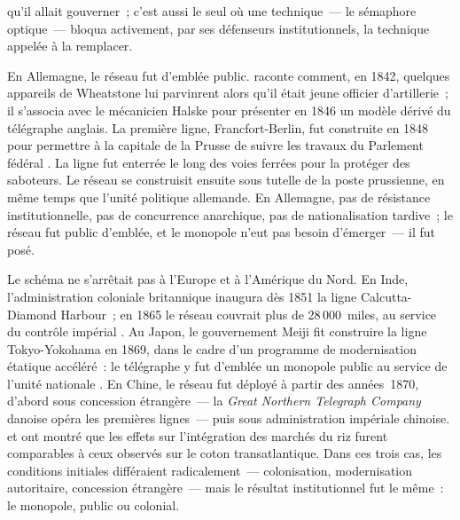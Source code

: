 qu'il allait gouverner~; c'est aussi le seul où une technique~--- le sémaphore optique~--- bloqua activement, par ses défenseurs institutionnels, la technique appelée à la remplacer.

%
En Allemagne, le réseau fut d'emblée public. \textcite{siemens_lebenserinnerungen_1892} raconte comment, en 1842, quelques appareils de Wheatstone lui parvinrent alors qu'il était jeune officier d'artillerie~; il s'associa avec le mécanicien Halske pour présenter en 1846 un modèle dérivé du télégraphe anglais. La première ligne, Francfort-Berlin, fut construite en 1848 pour permettre à la capitale de la Prusse de suivre les travaux du Parlement fédéral \parencite[ch.~2]{headrick_invisible_1991, bertho_histoire_1984}. La ligne fut enterrée le long des voies ferrées pour la protéger des saboteurs. Le réseau se construisit ensuite sous tutelle de la poste prussienne, en même temps que l'unité politique allemande. En Allemagne, pas de résistance institutionnelle, pas de concurrence anarchique, pas de nationalisation tardive~; le réseau fut public d'emblée, et le monopole n'eut pas besoin d'émerger~--- il fut posé.

%
Le schéma ne s'arrêtait pas à l'Europe et à l'Amérique du Nord. En Inde, l'administration coloniale britannique inaugura dès 1851 la ligne Calcutta-Diamond Harbour~; en 1865 le réseau couvrait plus de 28\,000~miles, au service du contrôle impérial \parencite[ch.~3]{headrick_invisible_1991}. Au Japon, le gouvernement Meiji fit construire la ligne Tokyo-Yokohama en 1869, dans le cadre d'un programme de modernisation étatique accéléré~: le télégraphe y fut d'emblée un monopole public au service de l'unité nationale \parencite[ch.~4]{headrick_invisible_1991}. En Chine, le réseau fut déployé à partir des années~1870, d'abord sous concession étrangère~--- la \emph{Great Northern Telegraph Company} danoise opéra les premières lignes~--- puis sous administration impériale chinoise. \textcite{hao_wiring_2022} et \textcite{gao_communication_2021} ont montré que les effets sur l'intégration des marchés du riz furent comparables à ceux observés sur le coton transatlantique. Dans ces trois cas, les conditions initiales différaient radicalement~--- colonisation, modernisation autoritaire, concession étrangère~--- mais le résultat institutionnel fut le même~: le monopole, public ou colonial.

